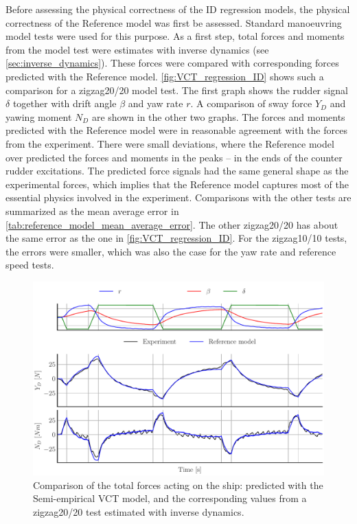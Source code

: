 Before assessing the physical correctness of the ID regression models, the physical correctness of the Reference model was first be assessed. Standard manoeuvring model tests were used for this purpose. As a first step, total forces and moments from the model test were estimates with inverse dynamics (see \autoref{sec:inverse_dynamics}). These forces were compared with corresponding forces predicted with the Reference model. 
\autoref{fig:VCT_regression_ID} shows such a comparison for a zigzag20/20 model test. The first graph shows the rudder signal $\delta$ together with drift angle $\beta$ and yaw rate $r$. A comparison of sway force $Y_D$ and yawing moment $N_D$ are shown in the other two graphs. The forces and moments predicted with the Reference model were in reasonable agreement with the forces from the experiment. There were small deviations, where the Reference model over predicted the forces and moments in the peaks -- in the ends of the counter rudder excitations. 
The predicted force signals had the same general shape as the experimental forces, which implies that the Reference model captures most of the essential physics involved in the experiment.
Comparisons with the other tests are summarized as the mean average error in \autoref{tab:reference_model_mean_average_error}. The other zigzag20/20 has about the same error as the one in \autoref{fig:VCT_regression_ID}. For the zigzag10/10 tests, the errors were smaller, which was also the case for the yaw rate and reference speed tests.
\begin{figure}[h!]
    \includegraphics[width=\columnwidth]{figures/result_VCT_regression.VCT_regression_ID.pdf}
    \caption{Comparison of the total forces acting on the ship: predicted with the Semi-empirical VCT model, and the corresponding values from a zigzag20/20 test estimated with inverse dynamics.}
    \label{fig:VCT_regression_ID}
\end{figure}

